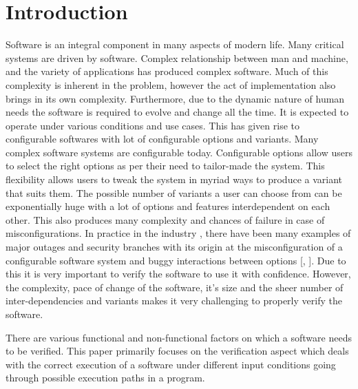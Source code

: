 \documentclass[ runningheads,
               a4paper]{llncs}
\begin{document}
\section{Introduction}
Software is an integral component in many aspects of modern life. Many critical systems are driven by software. Complex relationship between man and machine, and the variety of applications has produced complex software. Much of this complexity is inherent in the problem, however the act of implementation also brings in its own complexity. Furthermore, due to the dynamic nature of human needs the software is required to evolve and change all the time. It is expected to operate under various conditions and use cases. This has given rise to configurable softwares with lot of configurable options and variants. Many complex software systems are configurable today. Configurable options allow users to select the right options as per their need to tailor-made the system. This flexibility allows users to tweak the system in myriad ways to produce a variant that suits them. The possible number of variants a user can choose from can be exponentially huge with a lot of options and features interdependent on each other. This also produces many complexity and chances of failure in case of misconfigurations. In practice in the industry \cite[Holistic configuration management at facebook]{tang2015holistic}, there have been many examples of major outages and security branches with its origin at the misconfiguration of a configurable software system and buggy interactions between options [\cite{han2016empirical}, \cite{kenner2021safety}]. Due to this it is very important to verify the software to use it with confidence. However, the complexity, pace of change of the software, it's size and the sheer number of inter-dependencies and variants makes it very challenging to properly verify the software.


There are various functional and non-functional factors on which a software needs to be verified. This paper primarily focuses on the verification aspect which deals with the correct execution of a software under different input conditions going through possible execution paths in a program.
\end{document}
